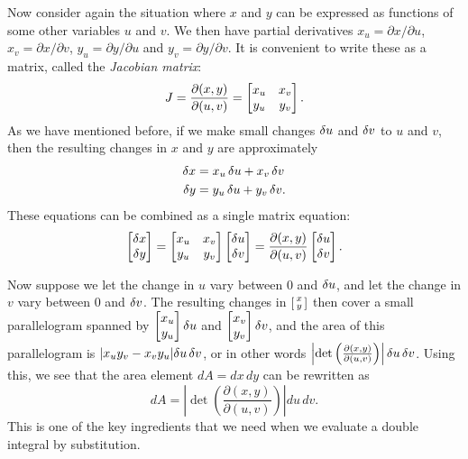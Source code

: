 \documentclass[reqno]{amsart}
\theoremstyle{definition}
\begin{document}
Now consider again the situation where $x$ and $y$ can be expressed as
functions of some other variables $u$ and $v$.  We then have partial
derivatives $x_u=\partial x/\partial u$, $x_v=\partial x/\partial v$,
$y_u=\partial y/\partial u$ and $y_v=\partial y/\partial v$.  It is
convenient to write these as a matrix, called the \emph{Jacobian
 matrix}: 
\[ J = \frac{\partial(x,y)}{\partial(u,v)} = 
    \left[\begin{matrix} x_u & x_v \\ y_u & y_v \end{matrix}\right].
\]
As we have mentioned before, if we make small changes $\delta u$ and 
$\delta v$ to $u$ and $v$, then the resulting changes in $x$ and $y$ are
approximately 
\begin{align*}
 \delta x &= x_u\,\delta u + x_v\,\delta v \\
 \delta y &= y_u\,\delta u + y_v\,\delta v.
\end{align*}
These equations can be combined as a single matrix equation:
\[ \left[\begin{matrix} \delta x\\ \delta y\end{matrix}\right] =
    \left[\begin{matrix} x_u & x_v \\ y_u & y_v \end{matrix}\right] \left[\begin{matrix} \delta u\\ \delta v\end{matrix}\right] =
     \frac{\partial(x,y)}{\partial(u,v)} \left[\begin{matrix} \delta u\\ \delta v\end{matrix}\right].
\]

Now suppose we let the change in $u$ vary between $0$ and $\delta u$, and
let the change in $v$ vary between $0$ and $\delta v$.  The resulting
changes in $\left[\begin{smallmatrix} x\\ y\end{smallmatrix}\right]$ then cover a small parallelogram spanned
by $\left[\begin{matrix} x_u\\ y_u\end{matrix}\right] \delta u$ and $\left[\begin{matrix} x_v\\ y_v\end{matrix}\right]\delta v$, and the
area of this parallelogram is $|x_uy_v-x_vy_u|\delta u\,\delta v$, or in
other words 
$\left|\det\left(\frac{\partial(x,y)}{\partial(u,v)}\right)\right|\delta u\,\delta v$.  
Using this, we see that the area element $dA=dx\,dy$ can be rewritten as 
\[ dA =
  \left|\det\left(\frac{\partial(x,y)}{\partial(u,v)}\right)\right|
   du\, dv. 
\]
This is one of the key ingredients that we need when we evaluate a
double integral by substitution.
\end{document}

